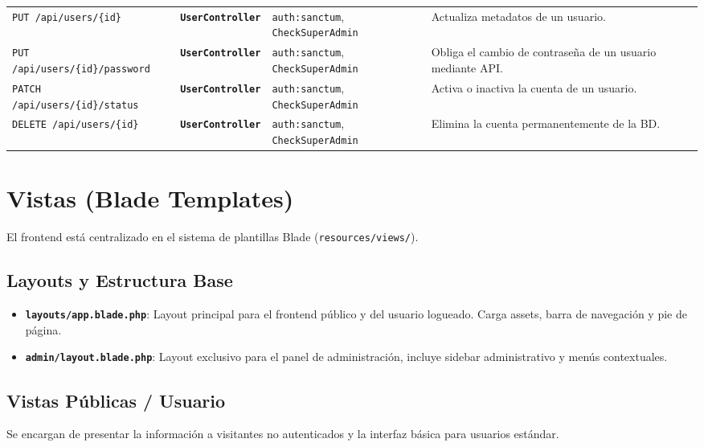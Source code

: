 \documentclass{article}
\begin{document}
\begin{longtable}{>{\raggedright\arraybackslash}p{4cm} >{\raggedright\arraybackslash}p{3cm} >{\raggedright\arraybackslash}p{3.5cm} >{\raggedright\arraybackslash}p{4.5cm}}
\texttt{PUT /api/users/\{id\}} & \textbf{\texttt{UserController}} & \texttt{auth:sanctum}, \texttt{CheckSuperAdmin} & Actualiza metadatos de un usuario. \\
\texttt{PUT /api/users/\{id\}/password} & \textbf{\texttt{UserController}} & \texttt{auth:sanctum}, \texttt{CheckSuperAdmin} & Obliga el cambio de contraseña de un usuario mediante API. \\
\texttt{PATCH /api/users/\{id\}/status} & \textbf{\texttt{UserController}} & \texttt{auth:sanctum}, \texttt{CheckSuperAdmin} & Activa o inactiva la cuenta de un usuario. \\
\texttt{DELETE /api/users/\{id\}} & \textbf{\texttt{UserController}} & \texttt{auth:sanctum}, \texttt{CheckSuperAdmin} & Elimina la cuenta permanentemente de la BD. \\
\end{longtable}

\section{Vistas (Blade Templates)}

El frontend está centralizado en el sistema de plantillas Blade (\texttt{resources/views/}).

\subsection{Layouts y Estructura Base}
\begin{itemize}
    \item \textbf{\texttt{layouts/app.blade.php}}: Layout principal para el frontend público y del usuario logueado. Carga assets, barra de navegación y pie de página.
    \item \textbf{\texttt{admin/layout.blade.php}}: Layout exclusivo para el panel de administración, incluye sidebar administrativo y menús contextuales.
\end{itemize}

\subsection{Vistas Públicas / Usuario}

Se encargan de presentar la información a visitantes no autenticados y la interfaz básica para usuarios estándar.
\end{document}
